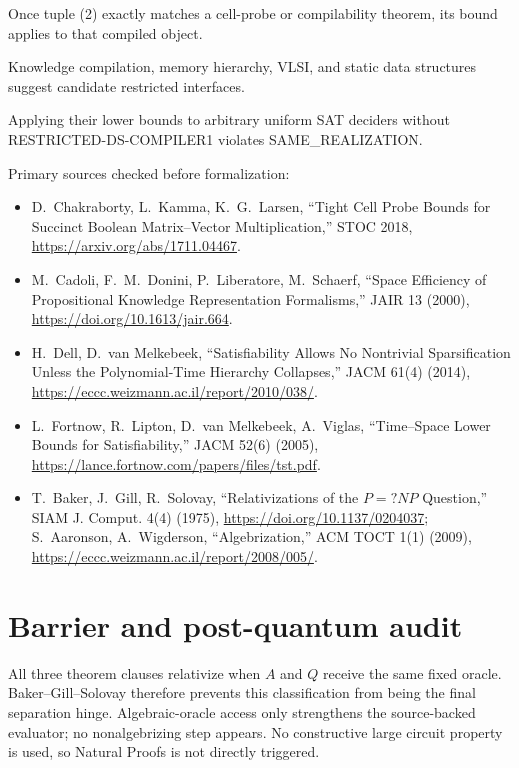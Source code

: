 \documentclass[11pt]{article}
\begin{document}
\begin{description}[leftmargin=3.3cm,style=nextline]
\item[THEOREM TRANSFER.]  Once tuple (2) exactly matches a cell-probe or
compilability theorem, its bound applies to that compiled object.
\item[ANALOGY / CANDIDATE.]  Knowledge compilation, memory hierarchy, VLSI,
and static data structures suggest candidate restricted interfaces.
\item[FAILED TRANSFER.]  Applying their lower bounds to arbitrary uniform SAT
deciders without RESTRICTED-DS-COMPILER1 violates SAME\_REALIZATION.
\end{description}

Primary sources checked before formalization:
\begin{itemize}[leftmargin=*]
\item D.~Chakraborty, L.~Kamma, K.~G.~Larsen, ``Tight Cell Probe Bounds for
Succinct Boolean Matrix--Vector Multiplication,'' STOC 2018,
\url{https://arxiv.org/abs/1711.04467}.
\item M.~Cadoli, F.~M.~Donini, P.~Liberatore, M.~Schaerf, ``Space Efficiency
of Propositional Knowledge Representation Formalisms,'' JAIR 13 (2000),
\url{https://doi.org/10.1613/jair.664}.
\item H.~Dell, D.~van Melkebeek, ``Satisfiability Allows No Nontrivial
Sparsification Unless the Polynomial-Time Hierarchy Collapses,'' JACM 61(4)
(2014), \url{https://eccc.weizmann.ac.il/report/2010/038/}.
\item L.~Fortnow, R.~Lipton, D.~van Melkebeek, A.~Viglas, ``Time--Space
Lower Bounds for Satisfiability,'' JACM 52(6) (2005),
\url{https://lance.fortnow.com/papers/files/tst.pdf}.
\item T.~Baker, J.~Gill, R.~Solovay, ``Relativizations of the $P=?NP$
Question,'' SIAM J. Comput. 4(4) (1975),
\url{https://doi.org/10.1137/0204037}; S.~Aaronson, A.~Wigderson,
``Algebrization,'' ACM TOCT 1(1) (2009),
\url{https://eccc.weizmann.ac.il/report/2008/005/}.
\end{itemize}

\section{Barrier and post-quantum audit}

All three theorem clauses relativize when $A$ and $Q$ receive the same fixed
oracle.  Baker--Gill--Solovay therefore prevents this classification from
being the final separation hinge.  Algebraic-oracle access only strengthens
the source-backed evaluator; no nonalgebrizing step appears.  No constructive
large circuit property is used, so Natural Proofs is not directly triggered.
\end{document}
